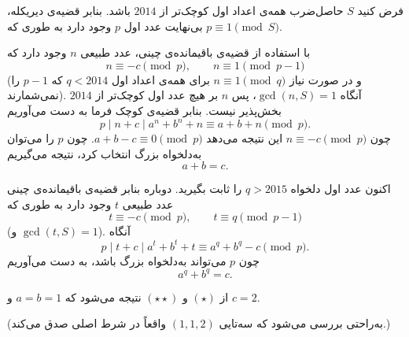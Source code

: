 فرض کنید $S$ حاصل‌ضرب همه‌ی اعداد اول کوچک‌تر از $2014$ باشد. بنابر قضیه‌ی دیریکله، بی‌نهایت عدد اول $p$ وجود دارد به طوری که $p \equiv 1 \pmod{S}$.

با استفاده از قضیه‌ی باقیمانده‌ی چینی، عدد طبیعی $n$ وجود دارد که
\[
n \equiv -c \pmod{p}, \qquad n \equiv 1 \pmod{p-1}
\]
(و در صورت نیاز $n \equiv 1 \pmod{q}$ برای همه‌ی اعداد اول $q < 2014$ که $p-1$ را نمی‌شمارند). آنگاه $\gcd(n,S)=1$، پس $n$ بر هیچ عدد اول کوچک‌تر از $2014$ بخش‌پذیر نیست. بنابر قضیه‌ی کوچک فرما به دست می‌آوریم
\[
p \mid n+c \mid a^n + b^n + n \equiv a + b + n \pmod{p}.
\]
چون $n \equiv -c \pmod{p}$ این نتیجه می‌دهد $a + b - c \equiv 0 \pmod{p}$. چون $p$ را می‌توان به‌دلخواه بزرگ انتخاب کرد، نتیجه می‌گیریم
\[
a + b = c. \tag{$\star$}
\]

اکنون عدد اول دلخواه $q > 2015$ را ثابت بگیرید. دوباره بنابر قضیه‌ی باقیمانده‌ی چینی عدد طبیعی $t$ وجود دارد به طوری که
\[
t \equiv -c \pmod{p}, \qquad t \equiv q \pmod{p-1}
\]
(و $\gcd(t,S)=1$). آنگاه
\[
p \mid t+c \mid a^t + b^t + t \equiv a^q + b^q - c \pmod{p}.
\]
چون $p$ می‌تواند به‌دلخواه بزرگ باشد، به دست می‌آوریم
\[
a^q + b^q = c. \tag{$\star\star$}
\]

از $(\star)$ و $(\star\star)$ نتیجه می‌شود که $a = b = 1$ و $c = 2$.

(به‌راحتی بررسی می‌شود که سه‌تایی $(1,1,2)$ واقعاً در شرط اصلی صدق می‌کند.)
